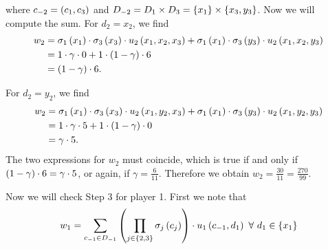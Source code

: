 \begin{enumerate} [label=\Alph*. ]
	      where $c_{-2} = \left(c_1, c_3\right)$ and $D_{-2} = D_{1} \times D_{3} = \left\{x_1\right\} \times \left\{x_3, y_3\right\}$.
	      Now we will compute the sum.
	      For $d_2 = x_2$, we find
	      \begin{align*}
	      	w_2
	      	  & = \sigma_{1} \left(x_{1}\right) \cdot \sigma_{3} \left(x_{3}\right) \cdot u_{2} \left(x_1, x_2, x_3\right) 
	      	+  \sigma_{1} \left(x_{1}\right) \cdot \sigma_{3} \left(y_{3}\right) \cdot u_{2} \left(x_1, x_2, y_3\right) \\
	      	  & = 1 \cdot \gamma \cdot 0                                                                       
	      	+  1 \cdot \left(1 - \gamma\right) \cdot 6 \\
	      	  & = \left(1 - \gamma\right) \cdot 6.                                                                 
	      \end{align*}
	      	              
	      For $d_2 = y_2$, we find
	      \begin{align*}
	      	w_2
	      	  & = \sigma_{1} \left(x_{1}\right) \cdot \sigma_{3} \left(x_{3}\right) \cdot u_{2} \left(x_1, y_2, x_3\right) 
	      	+  \sigma_{1} \left(x_{1}\right) \cdot \sigma_{3} \left(y_{3}\right) \cdot u_{2} \left(x_1, y_2, y_3\right) \\
	      	  & = 1 \cdot \gamma \cdot 5                                                                       
	      	+  1 \cdot \left(1 - \gamma\right) \cdot 0 \\
	      	  & = \gamma \cdot 5.                                                                              
	      \end{align*}
	      The two expressions for $w_2$ must coincide, which is true if and only if $\left(1 - \gamma\right) \cdot 6 = \gamma \cdot 5$, or again, if $\gamma = \frac{6}{11}$.
	      Therefore we obtain $w_2 = \frac{30}{11} = \frac{270}{99}$.
	      	              
	      \vspace{5mm}
	      	              
	      	          
	      	              
	      Now we will check Step 3 for player 1. First we note that
	      \begin{equation*}
	      	w_1 = \sum_{c_{-1} \in D_{-1}} \left(\prod_{j \in \left\{2,3\right\}} \sigma_{j} \left(c_{j}\right) \right) \cdot u_{1} \left(c_{-1}, d_1\right) \ \forall \ d_{1} \in \left\{x_1\right\}
	      \end{equation*}
	      	              

\end{enumerate}
